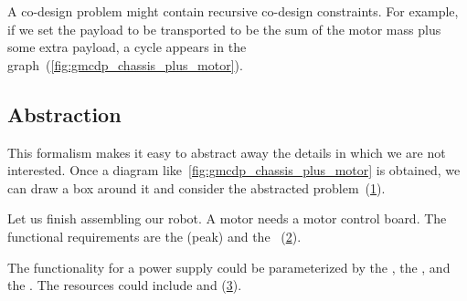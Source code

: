 \begin{example}
	A co-design problem might contain recursive co-design constraints.
	For example, if we set the payload to be transported to be the sum of the motor mass plus some extra payload, a cycle appears in the graph~(\cref{fig:gmcdp_chassis_plus_motor}).

	\begin{figure*}[h!]
		\centering
		\caption{}
		\label{fig:gmcdp_chassis_plus_motor}
	\end{figure*}

	\FloatBarrier \vfill\clearpage

	\subsection{Abstraction}
	This formalism makes it easy to abstract away the details in which we are not interested.
	Once a diagram like~\cref{fig:gmcdp_chassis_plus_motor} is obtained, we can draw a box around it and consider the abstracted problem~(\cref{fig:gmcdp_chassis_plus_motor-1}).

	\begin{figure}[h!]
		\centering
		\caption{}
		\label{fig:gmcdp_chassis_plus_motor-1}
	\end{figure}


	\label{exa:finish}Let us finish assembling our robot.
	A motor needs a motor control board.
	The functional requirements are the (peak)
	 and the ~(\cref{fig:mcb}).

	\begin{figure}[h!]
		\centering
		\caption{}
		\label{fig:mcb}
	\end{figure}


	The functionality for a power supply could be parameterized by the , the , and the .
	The resources could include  and  (\cref{fig:example-ba}).

	\begin{figure}[h!]
		\centering
		\caption{}
		\label{fig:example-ba}
	\end{figure}


\end{example}
